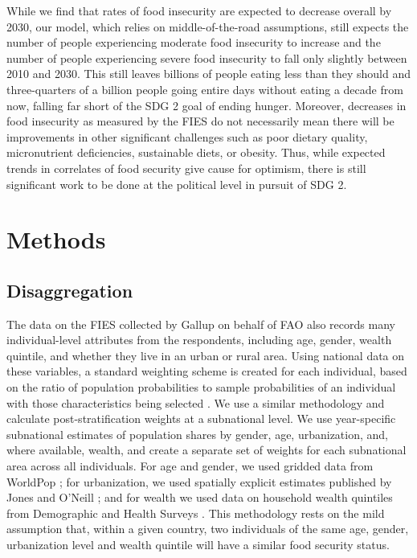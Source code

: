 \documentclass{article}
\begin{document}
While we find that rates of food insecurity are expected to decrease overall by 2030, our model, which relies on middle-of-the-road assumptions, still expects the number of people experiencing moderate food insecurity to increase and the number of people experiencing severe food insecurity to fall only slightly between 2010 and 2030.  This still leaves billions of people eating less than they should and three-quarters of a billion people going entire days without eating a decade from now, falling far short of the SDG 2 goal of ending hunger.  Moreover, decreases in food insecurity as measured by the FIES do not necessarily mean there will be improvements in other significant challenges such as poor dietary quality, micronutrient deficiencies, sustainable diets, or obesity.  Thus, while expected trends in correlates of food security give cause for optimism, there is still significant work to be done at the political level in pursuit of SDG 2.

\section{Methods}
\subsection{Disaggregation}
The data on the FIES collected by Gallup on behalf of FAO also records many individual-level attributes from the respondents, including age, gender, wealth quintile, and whether they live in an urban or rural area.  Using national data on these variables, a standard weighting scheme is created for each individual, based on the ratio of population probabilities to sample probabilities of an individual with those characteristics being selected \citep{bethlehem2009applied}.  We use a similar methodology and calculate post-stratification weights at a subnational level.  We use year-specific subnational estimates of population shares by gender, age, urbanization, and, where available, wealth, and create a separate set of weights for each subnational area across all individuals.  For age and gender, we used gridded data from WorldPop \citep{Tatem2017}; for urbanization, we used spatially explicit estimates published by Jones and O'Neill \citep{Jones2016}; and for wealth we used data on household wealth quintiles from Demographic and Health Surveys \citep{dhsall}.  This methodology rests on the mild assumption that, within a given country, two individuals of the same age, gender, urbanization level and wealth quintile will have a similar food security status.
\end{document}
